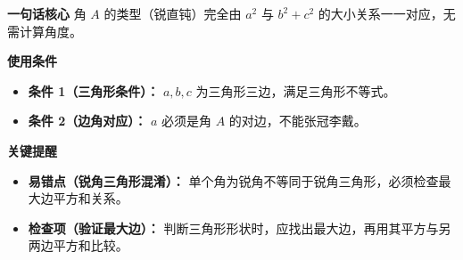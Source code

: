 \begin{summarybox}
	\textbf{\textcolor{CSummary}{一句话核心}}
	角 $A$ 的类型（锐直钝）完全由 $a^2$ 与 $b^2+c^2$ 的大小关系一一对应，无需计算角度。

	\medskip
	\textbf{\textcolor{CSummary}{使用条件}}
	\begin{itemize}[leftmargin=*, itemsep=0.5em, topsep=0.4em]
		\item \textbf{条件 1（三角形条件）：} $a,b,c$ 为三角形三边，满足三角形不等式。
		\item \textbf{条件 2（边角对应）：} $a$ 必须是角 $A$ 的对边，不能张冠李戴。
	\end{itemize}

	\medskip
	\textbf{\textcolor{CSummary}{关键提醒}}
	\begin{itemize}[leftmargin=*, itemsep=0.5em, topsep=0.4em]
		\item \textbf{易错点（锐角三角形混淆）：} 单个角为锐角不等同于锐角三角形，必须检查最大边平方和关系。
		\item \textbf{检查项（验证最大边）：} 判断三角形形状时，应找出最大边，再用其平方与另两边平方和比较。
	\end{itemize}

\end{summarybox}
